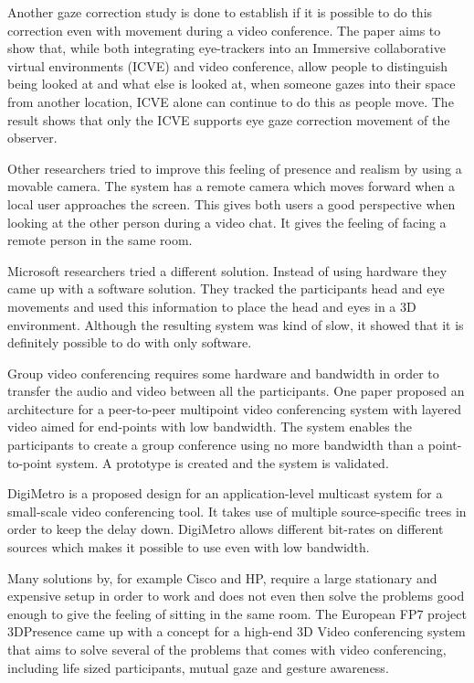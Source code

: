 \documentclass[12pt, titlepage]{article}
\begin{document}
Another gaze correction study is done to establish if it is possible to do this correction even with movement during a video conference\cite{20}. The paper aims to show that, while both integrating eye-trackers into an Immersive collaborative virtual
environments (ICVE) and video conference, allow people to distinguish being looked at and what else is looked at, when someone gazes into their space from another location, ICVE alone can continue to do this as people move. The result shows that only the ICVE supports eye gaze correction movement of the observer.

Other researchers tried to improve this feeling of presence and realism by using a movable camera\cite{19}. The system has a remote camera which moves forward when a local user approaches the screen. This gives both users a good perspective when looking at the other person during a video chat. It gives the feeling of facing a remote person in the same room.

Microsoft researchers tried a different solution. Instead of using hardware they came up with a software solution\cite{22}. They tracked the participants head and eye movements and used this information to place the head and eyes in a 3D environment. Although the resulting system was kind of slow, it showed that it is definitely possible to do with only software.

Group video conferencing requires some hardware and bandwidth in order to transfer the audio and video between all the participants.
One paper proposed an architecture for a peer-to-peer multipoint video conferencing system with layered video aimed for end-points with low bandwidth\cite{14}. The system enables the participants to create a group conference using no more bandwidth than a point-to-point system. A prototype is created and the system is validated.

DigiMetro\cite{16} is a proposed design for an application-level multicast system for a small-scale video conferencing tool. It takes use of multiple source-specific trees in order to keep the delay down. DigiMetro allows different bit-rates on different sources which makes it possible to use even with low bandwidth.

Many solutions by, for example Cisco and HP, require a large stationary and expensive setup in order to work and does not even then solve the problems good enough to give the feeling of sitting in the same room. The European FP7 project 3DPresence\cite{23} came up with a concept for a high-end 3D Video conferencing system that aims to solve several of the problems that comes with video conferencing, including life sized participants, mutual gaze and gesture awareness.
\end{document}

